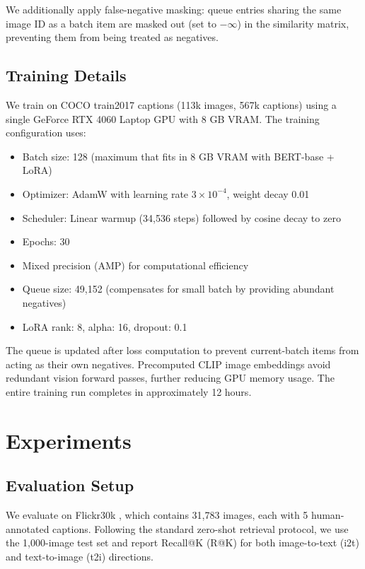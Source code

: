 \documentclass[10pt,leqno]{amsart}
\begin{document}
We additionally apply false-negative masking: queue entries sharing the same image ID as a batch item are masked out (set to $-\infty$) in the similarity matrix, preventing them from being treated as negatives.

\subsection{Training Details}

We train on COCO train2017 captions (113k images, 567k captions) using a single GeForce RTX 4060 Laptop GPU with 8 GB VRAM. The training configuration uses:
\begin{itemize}
    \item Batch size: 128 (maximum that fits in 8 GB VRAM with BERT-base + LoRA)
    \item Optimizer: AdamW with learning rate $3\times 10^{-4}$, weight decay 0.01
    \item Scheduler: Linear warmup (34,536 steps) followed by cosine decay to zero
    \item Epochs: 30
    \item Mixed precision (AMP) for computational efficiency
    \item Queue size: 49,152 (compensates for small batch by providing abundant negatives)
    \item LoRA rank: 8, alpha: 16, dropout: 0.1
\end{itemize}
The queue is updated after loss computation to prevent current-batch items from acting as their own negatives. Precomputed CLIP image embeddings avoid redundant vision forward passes, further reducing GPU memory usage. The entire training run completes in approximately 12 hours.

\section{Experiments}

\subsection{Evaluation Setup}

We evaluate on Flickr30k \citep{plummer2015flickr30k}, which contains 31,783 images, each with 5 human-annotated captions. Following the standard zero-shot retrieval protocol, we use the 1,000-image test set and report Recall@K (R@K) for both image-to-text (i2t) and text-to-image (t2i) directions.
\end{document}
